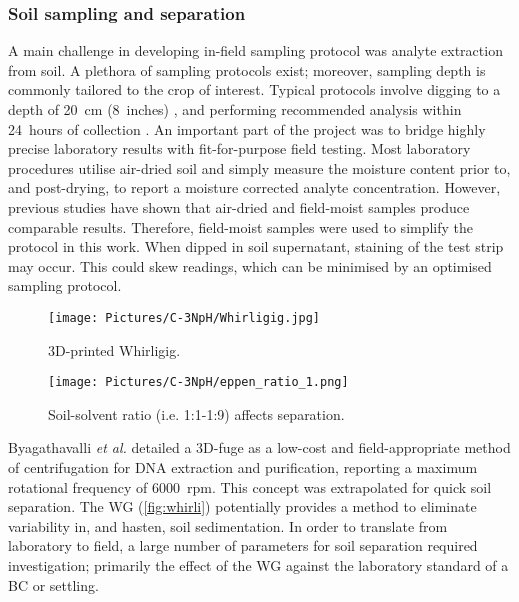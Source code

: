 \subsubsection{Soil sampling and separation}
A main challenge in developing in-field sampling protocol was analyte extraction from soil. A plethora of sampling protocols exist; moreover, sampling depth is commonly tailored to the crop of interest. Typical protocols involve digging to a depth of \SI{20}{cm} (\SI{8}{inches}) \cite{Mitchell2013}, and performing recommended analysis within \SI{24}{hours} of collection \cite{NaturalResourcesConservationService}. An important part of the project was to bridge highly precise laboratory results with fit-for-purpose field testing. Most laboratory procedures utilise air-dried soil and simply measure the moisture content prior to, and post-drying, to report a moisture corrected analyte concentration.\cite{ASTM1993}  However, previous studies have shown that air-dried and field-moist samples produce comparable results.\cite{Schmidhalter2005}  Therefore, field-moist samples were used to simplify the protocol in this work. When dipped in soil supernatant, staining of the test strip may occur. This could skew readings, which can be minimised by an optimised sampling protocol. %

\begin{figure}[h!]
	\centering
	\begin{minipage}[t]{0.4\textwidth}
	\centering
	\texttt{[image: Pictures/C-3NpH/Whirligig.jpg]}
	\captionsetup{justification = centering}
	\caption{3D-printed Whirligig.}
	\label{fig:whirli}
 	\end{minipage}
  	\begin{minipage}[t]{0.55\textwidth}
  	\centering
\texttt{[image: Pictures/C-3NpH/eppen\_ratio\_1.png]}
\captionsetup{justification = centering}
	\caption{Soil-solvent ratio (i.e. 1:1-1:9) affects separation.}
	\label{fig:eppen_ratio1}
	\end{minipage}
	\end{figure}

 Byagathavalli \textit{et al.} \cite{Byagathvalli2019} detailed a 3D-fuge as a low-cost and field-appropriate method of centrifugation for DNA extraction and purification, reporting a maximum rotational frequency of \SI{6000}{rpm}. This concept was extrapolated for quick soil separation. The WG  (\cref{fig:whirli}) potentially provides a method to eliminate variability in, and hasten, soil sedimentation. In order to translate from laboratory to field, a large number of parameters for soil separation required investigation; primarily the effect of the WG against the laboratory standard of a \gls{BC} or settling. %

